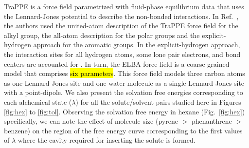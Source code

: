 \documentclass[final,12p,times,twocolumn]{elsarticle}
\begin{document}
	TraPPE is a force field parametrized with fluid-phase equilibrium data that uses the Lennard-Jones potential to describe the non-bonded interactions. In Ref.~, the authors used the united-atom description of the TraPPE force field for the alkyl group, the all-atom description for the polar groups and the explicit-hydrogen approach for the aromatic groups. In the explicit-hydrogen approach, the interaction sites for all hydrogen atoms, some lone pair electrons, and bond centers are accounted for \cite{doi:10.1021/jp073586l}. In turn, the ELBA force field is a coarse-grained model that comprises \hl{six parameters}. This force field models three carbon atoms as one Lennard-Jones site and one water molecule as a single Lennard Jones site with a point-dipole. We also present the solvation free energies corresponding to each alchemical state ($\lambda$) for all the solute/solvent pairs studied here in Figures \ref{fig:hex} to \ref{fig:tol}. Observing the solvation free energy in hexane (Fig.~\ref{fig:hex}) specifically, we can note the effect of molecule size (pyrene $>$ phenanthrene $>$ benzene) on the region of the free energy curve corresponding to the first values of $\lambda$ where the cavity required for inserting the solute is formed.
	
\end{document}

